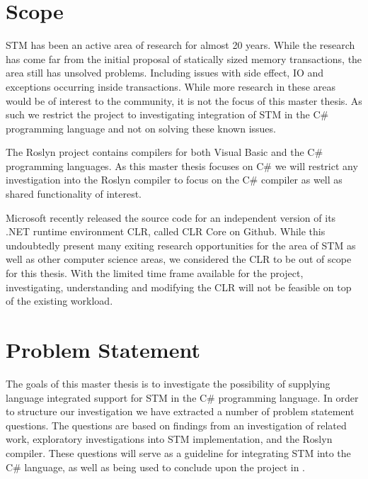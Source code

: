 \section{Scope}
\ac{STM} has been an active area of research for almost 20 years\cite{shavit1997software}. While the research has come far from the initial proposal of statically sized memory transactions, the area still has unsolved problems. Including issues with side effect, \ac{IO} and exceptions occurring inside transactions\cite{harris2005exceptions}. While more research in these areas would be of interest to the community, it is not the focus of this master thesis. As such we restrict the project to investigating integration of \ac{STM} in the C\# programming language and not on solving these known issues.

The Roslyn project contains compilers for both Visual Basic and the C\# programming languages\cite{roslyn}. As this master thesis focuses on C\# we will restrict any investigation into the Roslyn compiler to focus on the C\# compiler as well as shared functionality of interest. 

Microsoft recently released the source code for an independent version of its .NET runtime environment \acl{CLR}, called \ac{CLR} Core on Github\cite{coreclr}. While this undoubtedly present many exiting research opportunities for the area of \ac{STM} as well as other computer science areas, we considered the \ac{CLR} to be out of scope for this thesis. With the limited time frame available for the project, investigating, understanding and modifying the \ac{CLR} will not be feasible on top of the existing workload. 

\section{Problem Statement}
The goals of this master thesis is to investigate the possibility of supplying language integrated support for \ac{STM} in the C\# programming language. In order to structure our investigation we have extracted a number of problem statement questions. The questions are based on findings from an investigation of related work, exploratory investigations into \ac{STM} implementation, and the Roslyn compiler. These questions will serve as a guideline for integrating \ac{STM} into the C\# language, as well as being used to conclude upon the project in .

